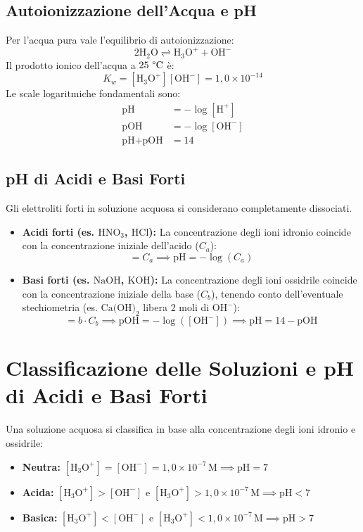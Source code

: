 \documentclass[11pt, a4paper, openright]{book}
\begin{document}
\subsection{Autoionizzazione dell'Acqua e pH}
Per l'acqua pura vale l'equilibrio di autoionizzazione:
\begin{equation}
2\text{H}_2\text{O} \rightleftharpoons \text{H}_3\text{O}^+ + \text{OH}^-
\end{equation}
Il prodotto ionico dell'acqua a $25\text{ \textdegree C}$ è:
\begin{equation}
K_w = [\text{H}_3\text{O}^+][\text{OH}^-] = 1{,}0 \times 10^{-14}
\end{equation}
Le scale logaritmiche fondamentali sono:
\begin{align}
\text{pH} &= -\log[\text{H}^+] \\
\text{pOH} &= -\log[\text{OH}^-] \\
\text{pH} + \text{pOH} &= 14
\end{align}

\subsection{pH di Acidi e Basi Forti}
Gli elettroliti forti in soluzione acquosa si considerano completamente dissociati.
\begin{itemize}
    \item \textbf{Acidi forti (es. $\text{HNO}_3$, $\text{HCl}$):} La concentrazione degli ioni idronio coincide con la concentrazione iniziale dell'acido ($C_a$):
    \begin{equation}
    [\text{H}^+] = C_a \implies \text{pH} = -\log(C_a)
    \end{equation}
    \item \textbf{Basi forti (es. $\text{NaOH}$, $\text{KOH}$):} La concentrazione degli ioni ossidrile coincide con la concentrazione iniziale della base ($C_b$), tenendo conto dell'eventuale stechiometria (es. $\text{Ca(OH)}_2$ libera 2 moli di $\text{OH}^-$):
    \begin{equation}
    [\text{OH}^-] = b \cdot C_b \implies \text{pOH} = -\log([\text{OH}^-]) \implies \text{pH} = 14 - \text{pOH}
    \end{equation}
\end{itemize}

\section{Classificazione delle Soluzioni e pH di Acidi e Basi Forti}
Una soluzione acquosa si classifica in base alla concentrazione degli ioni idronio e ossidrile:
\begin{itemize}
    \item \textbf{Neutra:} $[\text{H}_3\text{O}^+] = [\text{OH}^-] = 1{,}0 \times 10^{-7} \, \text{M} \implies \text{pH} = 7$
    \item \textbf{Acida:} $[\text{H}_3\text{O}^+] > [\text{OH}^-]$ e $[\text{H}_3\text{O}^+] > 1{,}0 \times 10^{-7} \, \text{M} \implies \text{pH} < 7$
    \item \textbf{Basica:} $[\text{H}_3\text{O}^+] < [\text{OH}^-]$ e $[\text{H}_3\text{O}^+] < 1{,}0 \times 10^{-7} \, \text{M} \implies \text{pH} > 7$
\end{itemize}
\end{document}

